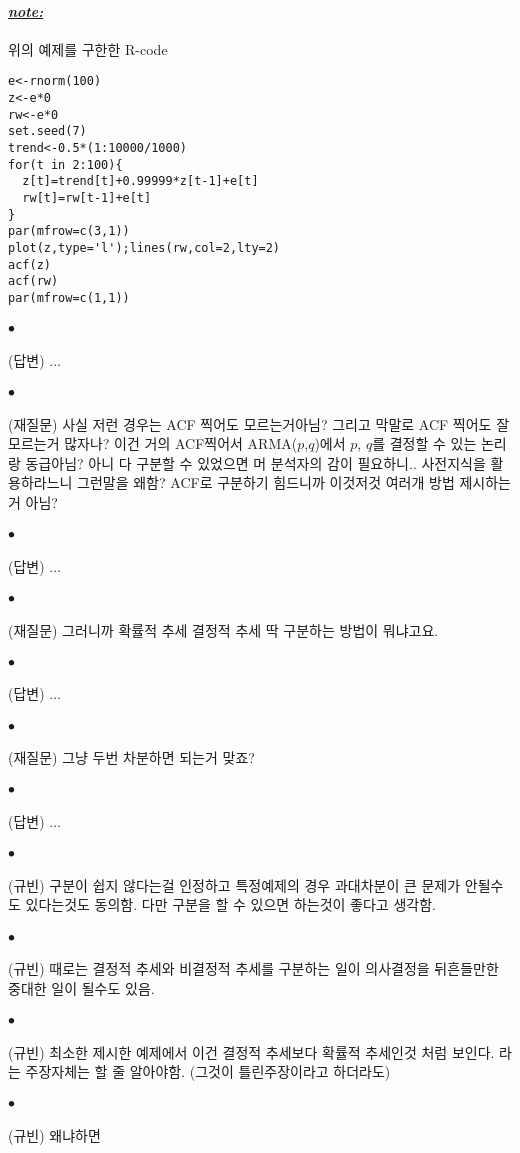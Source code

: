 \documentclass[12pt,oneside,english]{book}
\def\ck{\paragraph{\Large$\bullet$}\Large}
\def\note{\paragraph{\Large\textit{\underline{note:}}}\Large}
\begin{document}
\note 위의 예제를 구한한 R-code
\begin{lstlisting}
e<-rnorm(100)
z<-e*0
rw<-e*0
set.seed(7)
trend<-0.5*(1:10000/1000)
for(t in 2:100){
  z[t]=trend[t]+0.99999*z[t-1]+e[t]
  rw[t]=rw[t-1]+e[t]
}
par(mfrow=c(3,1))
plot(z,type='l');lines(rw,col=2,lty=2)
acf(z)
acf(rw)
par(mfrow=c(1,1))
\end{lstlisting}

\begin{figure}[h]
\end{figure}
\ck (답변) ... 

\ck (재질문) 사실 저런 경우는 ACF 찍어도 모르는거아님? 그리고 막말로 ACF 찍어도 잘 모르는거 많자나? 이건 거의 ACF찍어서 ARMA($p$,$q$)에서 $p$, $q$를 결정할 수 있는 논리랑 동급아님? 아니 다 구분할 수 있었으면 머 분석자의 감이 필요하니.. 사전지식을 활용하라느니 그런말을 왜함? ACF로 구분하기 힘드니까 이것저것 여러개 방법 제시하는거 아님? 

\ck (답변) ... 

\ck (재질문) 그러니까 확률적 추세 결정적 추세 딱 구분하는 방법이 뭐냐고요. 

\ck (답변) ... 

\ck (재질문) 그냥 두번 차분하면 되는거 맞죠? 

\ck (답변) ... 

\ck (규빈) 구분이 쉽지 않다는걸 인정하고 특정예제의 경우 과대차분이 큰 문제가 안될수도 있다는것도 동의함. 다만 구분을 할 수 있으면 하는것이 좋다고 생각함. 

\ck (규빈) 때로는 결정적 추세와 비결정적 추세를 구분하는 일이 의사결정을 뒤흔들만한 중대한 일이 될수도 있음. 

\ck (규빈) 최소한 제시한 예제에서 이건 결정적 추세보다 확률적 추세인것 처럼 보인다. 라는 주장자체는 할 줄 알아야함. (그것이 틀린주장이라고 하더라도)

\ck (규빈) 왜냐하면 
\end{document}

